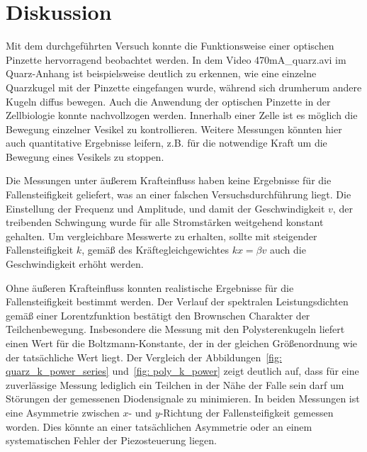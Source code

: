 \section{Diskussion}
\label{sec: diskussion}

Mit dem durchgeführten Versuch konnte die Funktionsweise einer optischen Pinzette
hervorragend beobachtet werden. In dem Video 470mA\_quarz.avi im Quarz-Anhang ist beispielsweise
deutlich zu erkennen, wie eine einzelne Quarzkugel mit der Pinzette eingefangen wurde, während sich
drumherum andere Kugeln diffus bewegen. Auch die Anwendung der optischen Pinzette in der Zellbiologie
konnte nachvollzogen werden. Innerhalb einer Zelle ist es möglich die Bewegung einzelner Vesikel
zu kontrollieren. Weitere Messungen könnten hier auch quantitative Ergebnisse leifern, z.B. für die
notwendige Kraft um die Bewegung eines Vesikels zu stoppen.

Die Messungen unter äußerem Krafteinfluss haben keine Ergebnisse für die Fallensteifigkeit geliefert, was
an einer falschen Versuchsdurchführung liegt. Die Einstellung der Frequenz und Amplitude, und
damit der Geschwindigkeit $v$, der treibenden
Schwingung wurde für alle Stromstärken weitgehend konstant gehalten. Um vergleichbare Messwerte zu erhalten,
sollte mit steigender Fallensteifigkeit $k$, gemäß des Kräftegleichgewichtes $kx = \beta v$ auch die
Geschwindigkeit erhöht werden.

Ohne äußeren Krafteinfluss konnten realistische Ergebnisse für die Fallensteifigkeit bestimmt werden. Der
Verlauf der spektralen Leistungsdichten gemäß einer Lorentzfunktion bestätigt den Brownschen Charakter der
Teilchenbewegung. Insbesondere die Messung mit den Polysterenkugeln liefert einen Wert für die Boltzmann-Konstante, der
in der gleichen Größenordnung wie der tatsächliche Wert liegt. Der Vergleich der Abbildungen~\ref{fig: quarz_k_power_series}
und~\ref{fig: poly_k_power} zeigt deutlich auf, dass für eine zuverlässige Messung lediglich ein Teilchen in der Nähe der
Falle sein darf um Störungen der gemessenen Diodensignale zu minimieren.
In beiden Messungen ist eine Asymmetrie zwischen $x$- und $y$-Richtung der Fallensteifigkeit gemessen worden. Dies könnte
an einer tatsächlichen Asymmetrie oder an einem systematischen Fehler der Piezosteuerung liegen.
